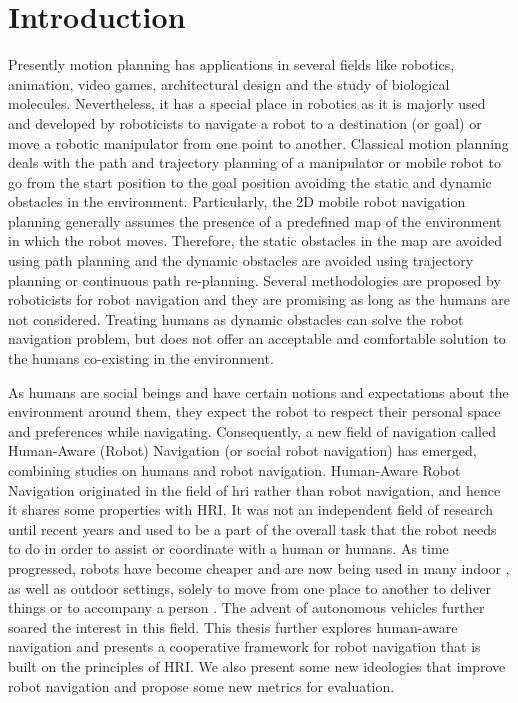 \chapter*{Introduction}

Presently motion planning has applications in several fields \cite{latombe1999motion} like robotics, animation, video games, architectural design and the study of biological molecules. Nevertheless, it has a special place in robotics as it is majorly used and developed by roboticists to navigate a robot to a destination (or goal) or move a robotic manipulator from one point to another. Classical motion planning deals with the path and trajectory planning of a manipulator or mobile robot to go from the start position to the goal position avoiding the static and dynamic obstacles in the environment. Particularly, the 2D mobile robot navigation planning generally assumes the presence of a predefined map of the environment in which the robot moves. Therefore, the static obstacles in the map are avoided using path planning and the dynamic obstacles are avoided using trajectory planning or continuous path re-planning. Several methodologies are proposed by roboticists for robot navigation and they are promising as long as the humans are not considered. Treating humans as dynamic obstacles can solve the robot navigation problem, but does not offer an acceptable and comfortable solution to the humans co-existing in the environment. 

As humans are social beings and have certain notions and expectations about the environment around them, they expect the robot to respect their personal space and preferences while navigating. Consequently, a new field of navigation called Human-Aware (Robot) Navigation (or social robot navigation) has emerged, combining studies on humans and robot navigation. Human-Aware Robot Navigation originated in the field of \acrfull{hri} rather than robot navigation, and hence it shares some properties with HRI. It was not an independent field of research until recent years and used to be a part of the overall task that the robot needs to do in order to assist or coordinate with a human or humans. As time progressed, robots have become cheaper and are now being used in many indoor \cite{guldenring2020learning}, as well as outdoor \cite{ferrer2013social} settings, solely to move from one place to another to deliver things \cite{bogue2016growth} or to accompany a person \cite{repiso2017line}. The advent of autonomous vehicles \cite{rasouli2019autonomous} further soared the interest in this field. This thesis further explores human-aware navigation and presents a cooperative framework for robot navigation that is built on the principles of HRI. We also present some new ideologies that improve robot navigation and propose some new metrics for evaluation.     

